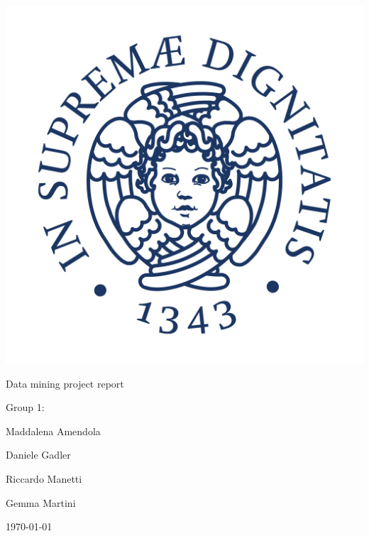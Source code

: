 \documentclass[a4paper]{article}
\begin{document}
\begin{titlepage}
\begin{center}
\vspace{3cm}

\Large

\vspace{2cm}

  \includegraphics[scale=0.3]{imgs/Cherubino.jpg}

\vspace{2.5cm}

{\Huge \sc Data mining project report}

\vspace{1cm}

Group 1:
\vspace{1cm}


Maddalena Amendola

\vspace{1cm}

Daniele Gadler

\vspace{1cm}

Riccardo Manetti

\vspace{1cm}

Gemma Martini

\vfill

\today

\end{center}
\end{titlepage}
\end{document}
